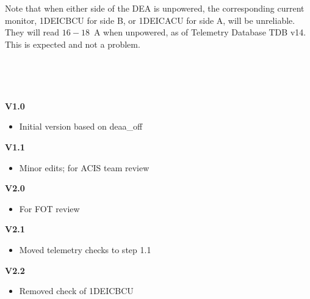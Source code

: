 \documentclass[11pt]{article}
\begin{document}
\normalsize
{} \\
\normalsize


\normalsize
{} \\
\normalsize

Note that when either side of the DEA is unpowered, the corresponding current monitor,
1DEICBCU for side B, or 1DEICACU for side A, will be unreliable.
They will read $16-18$~A when unpowered, as of Telemetry Database TDB v14.
This is expected and not a problem.



\vspace{0.15in}
\normalsize
{} \\
\normalsize

\normalsize
{} \\
\normalsize

{\bf V1.0}
\begin{itemize}
\item Initial version based on deaa\_off
\end{itemize}

{\bf V1.1}
\begin{itemize}
\item Minor edits; for ACIS team review
\end{itemize}

{\bf V2.0}
\begin{itemize}
\item For FOT review
\end{itemize}

{\bf V2.1}
\begin{itemize}
\item Moved telemetry checks to step 1.1
\end{itemize}

{\bf V2.2}
\begin{itemize}
\item Removed check of 1DEICBCU
\end{itemize}

\newcommand{\tablecaptiontext}{TURN OFF DEA B (realtime version)}

\end{document}
